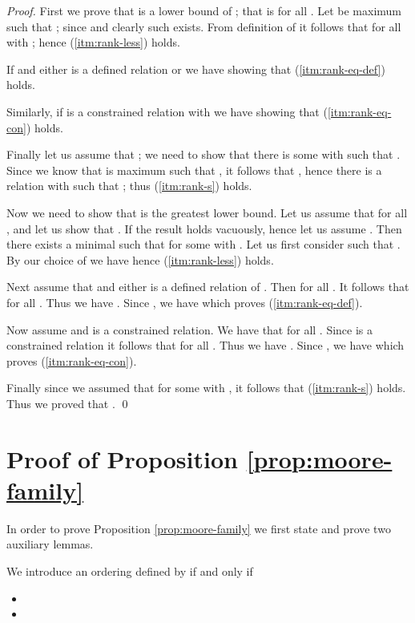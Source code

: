 \begin{proof}
  First we prove that  is a lower bound of ; that is
   for all . Let 
  be maximum such that ; since  and  clearly such  exists. From definition of 
  it follows that  for all  with
  ; hence (\ref{itm:rank-less}) holds.

  \noindent If  and either  is a defined relation or
   we have  showing that
  (\ref{itm:rank-eq-def}) holds.

  \noindent Similarly, if  is a constrained relation with
   we have  showing that
  (\ref{itm:rank-eq-con}) holds.

  \noindent Finally let us assume that ; we need to show
  that there is some  with  such that . Since we know that  is maximum such that
  , it follows that , hence
  there is a relation  with  such that ; thus (\ref{itm:rank-s}) holds.

  \noindent Now we need to show that  is the greatest
  lower bound. Let us assume that  for
  all , and let us show that . If  the result holds vacuously,
  hence let us assume . Then there exists a
  minimal  such that  for some 
  with . Let us first consider  such that
  . By our choice of  we have  hence (\ref{itm:rank-less}) holds.

  \noindent Next assume that  and either  is a defined
  relation of . Then  for all
  . It follows that  for all . Thus we have . Since
  ,
  we have  which proves
  (\ref{itm:rank-eq-def}).

  \noindent Now assume  and  is a constrained
  relation. We have that  for all
  . Since  is a constrained relation it follows
  that  for all . Thus we have . Since , we have  which proves (\ref{itm:rank-eq-con}).

  \noindent Finally since we assumed that  for some  with , it follows that
  (\ref{itm:rank-s}) holds. Thus we proved that .
  \qed

\end{proof}

\section{Proof of Proposition \ref{prop:moore-family}}\label{proof:prop:moore-family}

In order to prove Proposition \ref{prop:moore-family} we first state
and prove two auxiliary lemmas.

\begin{definition}\label{def:order-j}
\noindent We introduce  an ordering  defined by  if and only if
\begin{itemize}
\item 
\item 
\end{itemize}
\end{definition}

